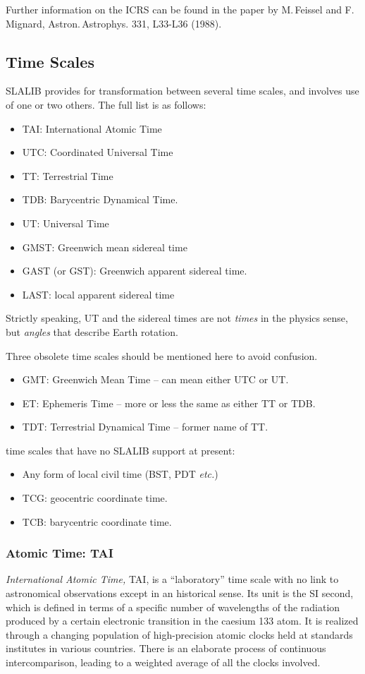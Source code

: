 \documentclass[11pt,twoside]{article}
\begin{document}
Further information on the ICRS can be found in the paper by M.\,Feissel
and F.\,Mignard, Astron.\,Astrophys. 331, L33-L36 (1988).

\subsection{Time Scales}

SLALIB provides for transformation between several time scales, and involves
use of one or two others.  The full list is as follows:
\begin{itemize}
\item TAI: International Atomic Time
\item UTC: Coordinated Universal Time
\item TT: Terrestrial Time
\item TDB: Barycentric Dynamical Time.
\item UT: Universal Time
\item GMST: Greenwich mean sidereal time
\item GAST (or GST): Greenwich apparent sidereal time.
\item LAST: local apparent sidereal time
\end{itemize}
Strictly speaking, UT and the sidereal times are not {\it times}\/ in
the physics sense, but {\it angles}\/ that describe Earth rotation.

Three obsolete time scales should be mentioned here to avoid confusion.
\begin{itemize}
\item GMT: Greenwich Mean Time -- can mean either UTC or UT.
\item ET: Ephemeris Time -- more or less the same as either TT or TDB.
\item TDT: Terrestrial Dynamical Time -- former name of TT.
\end{itemize}

time scales that have no SLALIB support at present:
\begin{itemize}
\item Any form of local civil time (BST, PDT {\it etc.})
\item TCG: geocentric coordinate time.
\item TCB: barycentric coordinate time.
\end{itemize}

\subsubsection{Atomic Time: TAI}
{\it International Atomic Time,} TAI, is a ``laboratory''
time scale with no link to astronomical observations
except in an historical sense.  Its
unit is the SI second, which is defined in terms of a
specific number
of wavelengths of the radiation produced by a certain electronic
transition in the caesium 133 atom.  It
is realized through a changing
population of high-precision atomic clocks held
at standards institutes in various countries.  There is an
elaborate process of continuous intercomparison, leading to
a weighted average of all the clocks involved.
\end{document}
